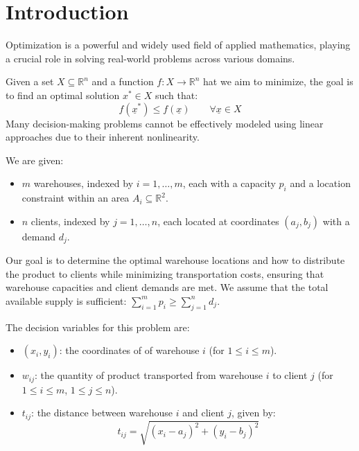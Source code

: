 \section{Introduction}

Optimization is a powerful and widely used field of applied mathematics, playing a crucial role in solving real-world problems across various domains.

Given a set $X\subseteq\mathbb{R}^n$ and a function $f:X \rightarrow \mathbb{R}^n$ hat we aim to minimize, the goal is to find an optimal solution $x^{\ast}\in X$ such that:
\[f(\underline{x}^{\ast})\leq f(\underline{x}) \qquad \forall\underline{x}\in X\]
Many decision-making problems cannot be effectively modeled using linear approaches due to their inherent nonlinearity.

\begin{example}
    We are given:
    \begin{itemize}
        \item $m$ warehouses, indexed by $i = 1,\dots, m$, each with a capacity $p_i$ and a location constraint within an area $A_i\subseteq\mathbb{R}^2$. 
        \item $n$ clients, indexed by $j = 1,\dots, n$, each located at coordinates $(a_j, b_j)$ with a demand $d_j$.
    \end{itemize}
    Our goal is to determine the optimal warehouse locations and how to distribute the product to clients while minimizing transportation costs, ensuring that warehouse capacities and client demands are met. 
    We assume that the total available supply is sufficient: $\sum_{i=1}^{m}p_i\geq\sum_{j=1}^{n}d_j$. 

    The decision variables for this problem are: 
    \begin{itemize}
        \item $(x_i,y_i)$: the coordinates of of warehouse $i$ (for $1 \leq i \leq m$).
        \item $w_{ij}$: the quantity of product transported from warehouse $i$ to client $j$ (for $1 \leq i \leq m$, $1 \leq j \leq n$).
        \item $t_{ij}$: the distance between warehouse $i$ and client $j$, given by: 
            \[t_{ij}=\sqrt{(x_{i}-a_j)^2+(y_{i}-b_j)^2}\]
    \end{itemize}


\end{example}
